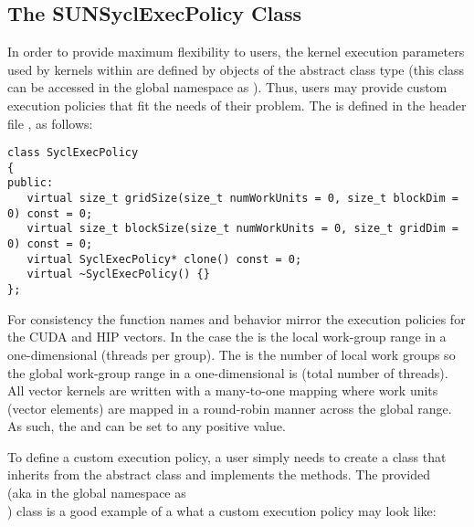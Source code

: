 \subsection{The SUNSyclExecPolicy Class}
\label{ss:sunsyclexecpolicy}

In order to provide maximum flexibility to users, the {\sycl} kernel execution
parameters used by kernels within {\sundials} are defined by objects of the
 abstract class type (this class can be accessed in
the global namespace as ). Thus, users may provide custom
execution policies that fit the needs of their problem. The
 is defined in the header file
, as follows:

\begin{verbatim}
class SyclExecPolicy
{
public:
   virtual size_t gridSize(size_t numWorkUnits = 0, size_t blockDim = 0) const = 0;
   virtual size_t blockSize(size_t numWorkUnits = 0, size_t gridDim = 0) const = 0;
   virtual SyclExecPolicy* clone() const = 0;
   virtual ~SyclExecPolicy() {}
};
\end{verbatim}

For consistency the function names and behavior mirror the execution policies
for the CUDA and HIP vectors. In the {\sycl} case the  is the local
work-group range in a one-dimensional  (threads per group). The
 is the number of local work groups so the global work-group range
in a one-dimensional  is  (total number of
threads). All vector kernels are written with a many-to-one mapping where work
units (vector elements) are mapped in a round-robin manner across the global
range. As such, the  and  can be set to any positive
value.

To define a custom execution policy, a user simply needs to create a class that
inherits from the abstract class and implements the methods. The {\sundials}
provided \\ \noindent
{} (aka in the global namespace
as \\ \noindent
{}) class is a good example of a what a custom
execution policy may look like:

